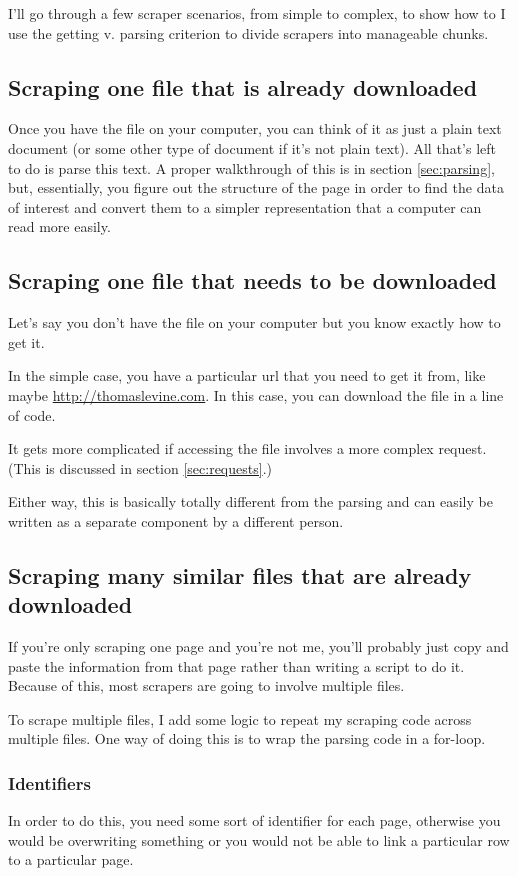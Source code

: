 \documentclass{article}
\begin{document}
I'll go through a few scraper scenarios, from simple to complex, to
show how to I use the getting v. parsing criterion to divide scrapers
into manageable chunks.

\subsection{Scraping one file that is already downloaded}
Once you have the file on your computer, you can think of it as
just a plain text document (or some other type of document if it's
not plain text). All that's left to do is parse this text.
A proper walkthrough of this is in section \ref{sec:parsing},
but, essentially, you figure out the structure of the page in order
to find the data of interest and convert them to a simpler
representation that a computer can read more easily.

\subsection{Scraping one file that needs to be downloaded}
Let's say you don't have the file on your computer but you know
exactly how to get it.

In the simple case, you have a particular url that you need
to get it from, like maybe \url{http://thomaslevine.com}.
In this case, you can download the file in a line of code.

It gets more complicated if accessing the file involves a
more complex request. (This is discussed in section
\ref{sec:requests}.)

Either way, this is basically totally different from the parsing
and can easily be written as a separate component by a different person.

\subsection{Scraping many similar files that are already downloaded}\label{sec:many_downloaded}
If you're only scraping one page and you're not me, you'll probably just
copy and paste the information from that page rather than writing
a script to do it. Because of this, most scrapers are going to involve
multiple files.

To scrape multiple files, I add some logic to repeat my scraping code
across multiple files. One way of doing this is to wrap the parsing
code in a for-loop.

\subsubsection{Identifiers}
In order to do this, you need some sort of identifier for each page,
otherwise you would be overwriting something or you would not be able
to link a particular row to a particular page.
\end{document}
